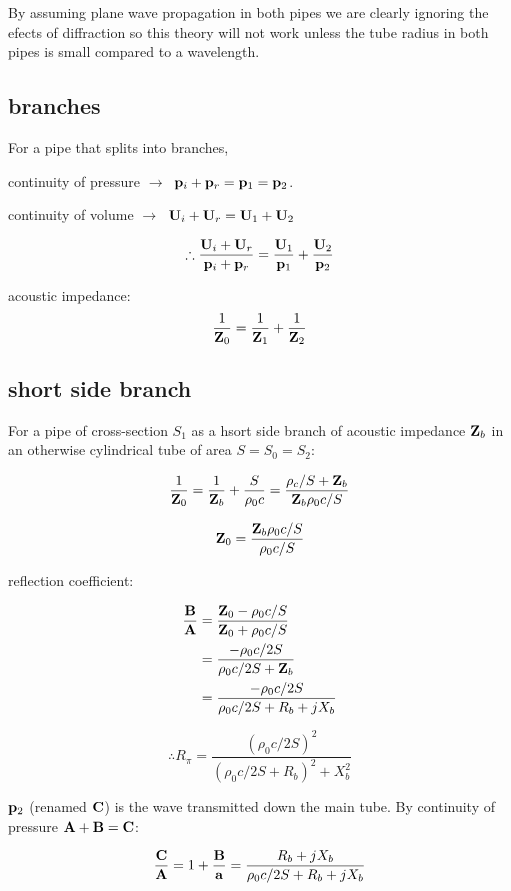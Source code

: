 \documentclass[10pt, a4paper, twocolumn]{article}
\newcommand{\arr}{\ensuremath{\longrightarrow\ }}
\begin{document}
By assuming plane wave propagation in both pipes we are clearly ignoring the efects of diffraction so this theory will not work unless the tube radius in both pipes is small compared to a wavelength.

\subsection{branches}

For a pipe that splits into branches,
\par continuity of pressure \arr
$\vb p_i + \vb p_r =\vb p_1 =\vb p_2$. 
\par continuity of volume \arr
$\vb U_i + \vb U_r = \vb U_1 + \vb U_2$

\[\therefore
\frac{\vb U_i+\vb U_r}{\vb p_i+\vb p_r}
=\frac{\vb U_1}{\vb p_1} +\frac{\vb U_2}{\vb p_2}\]

acoustic impedance:
\[\frac{1}{\vb Z_0}
= \frac{1}{\vb Z_1} + \frac{1}{\vb Z_2} \]

\subsection{short side branch}

For a pipe of cross-section $S_1$ as a hsort side branch of acoustic impedance $\vb Z_b$ in an otherwise cylindrical tube of area $S=S_0=S_2$:

\[\frac{1}{\vb Z_0} = \frac{1}{\vb Z_b}+\frac{S}{\rho _0c}
=\frac{\rho _c/S+\vb Z_b}{\vb Z_b \rho _0c/S}\]

\[\vb Z_0 = \frac{\vb Z_b \rho _0c/S}{\rho _0c/S}\]

reflection coefficient:

\begin{equation*}
\begin{aligned}
\frac{\vb B}{\vb A}
&= \frac{\vb Z_0-\rho _0 c/S}{\vb Z_0+\rho _0 c/S}
\\&=\frac{-\rho _0c/2S}{\rho _0 c/2S + \vb Z_b}
\\&=\frac{-\rho _0c/2S}{\rho _0c/2S+R_b+jX_b}
\end{aligned}
\end{equation*}

\[\therefore R_\pi
=\frac{(\rho _0c/2S)^2}{(\rho _0c/2S+R_b)^2+X_b^2}\]

$\vb p_2$ (renamed $\vb C$) is the wave transmitted down the main tube. By continuity of pressure $\vb A+\vb B=\vb C$:

\[\frac{\vb C}{\vb A} = 1 +\frac{\vb B}{\vb a}
=\frac{R_b + jX_b}{\rho _0c/2S + R_b +jX_b}\]
\end{document}

